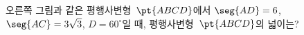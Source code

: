 \noindent\begin{minipage}[t]{0.58\linewidth}\vspace{0pt}\raggedright 오른쪽 그림과 같은 평행사변형~$\pt{ABCD}$에서 $\seg{AD}=6$, $\seg{AC}=3\sqrt{3}$, $D=60^\circ$일 때, 평행사변형~$\pt{ABCD}$의 넓이는?\end{minipage}\hfill\begin{minipage}[t]{0.4\linewidth}\vspace{0pt}\centering \resizebox{\ifdim\width>\linewidth\linewidth\else\width\fi}{!}{}\end{minipage}\par
{}
